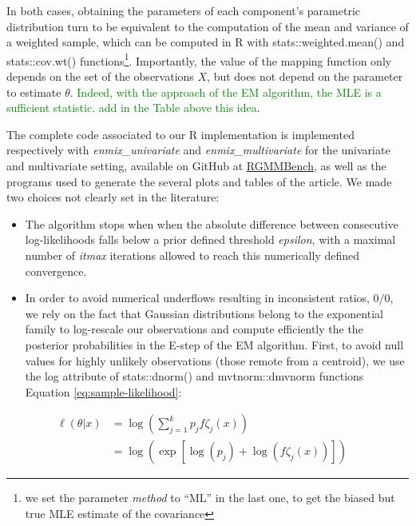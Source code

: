 In both cases, obtaining the parameters of each component's parametric distribution
turn to be equivalent to the computation of the mean and variance of a
weighted sample, which can be computed in R with
stats::weighted.mean() and
stats::cov.wt() functions\footnote{we set the parameter \emph{method} to
  ``ML'' in the last one, to get the biased but true MLE estimate of the covariance}. Importantly, the value of the mapping function only depends on the set of the observations \(X\), but does not depend on the parameter to estimate \(\theta\). \textcolor{green}{Indeed, with the approach of the EM algorithm, the MLE is a sufficient statistic. add in the Table above this idea}.

The complete code associated to our R implementation is implemented respectively
with \emph{enmix\_univariate} and \emph{enmix\_multivariate} for the univariate and multivariate setting,
available on GitHub at \href{github.com/bastienchassagnol/RGMMBench}{RGMMBench}, as well as the
programs used to generate the several plots and tables of the article.
We made two choices not clearly set in the literature:

\begin{itemize}
\tightlist
\item
  The algorithm stops when when the absolute difference between
  consecutive log-likelihoods falls below a prior defined threshold
  \emph{epsilon}, with a maximal number of \emph{itmax} iterations allowed to
  reach this numerically defined convergence.
\item
  In order to avoid numerical underflows resulting in inconsistent ratios, \(0/0\), we rely on the fact that Gaussian distributions belong to the exponential family to log-rescale our observations and compute efficiently the the posterior probabilities in the E-step of the EM algorithm. First, to avoid null values for highly unlikely observations (those remote from a centroid), we use the log attribute of stats::dnorm() and mvtnorm::dmvnorm functions Equation \eqref{eq:sample-likelihood}:
\end{itemize}

\begin{equation}
\begin{split}
        \ell (\theta|x) &= \log (\sum_{j=1}^k p_j f{\zeta_j} (x)) \\
        & = \log \left( \exp \left[ \log(p_j) + \log(f{\zeta_j} (x)) \right]\right) \quad
\end{split}
\label{eq:sample-likelihood}
\end{equation}

